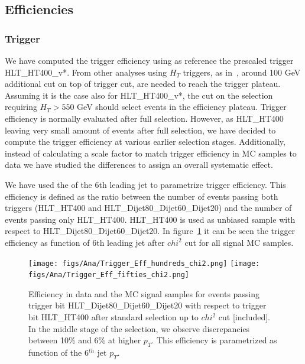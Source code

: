 \subsection{Efficiencies}
\label{sec:eff}

\subsubsection{Trigger}
\label{sec:trigger_ana}

We have computed the trigger efficiency using as reference the prescaled trigger HLT\_HT400\_v*. From other analyses using $H_{T}$ triggers, as in~\cite{Khachatryan:2015axa}, around 100 GeV additional cut on top of trigger cut, are needed to reach the trigger plateau. Assuming it is the case also for HLT\_HT400\_v*, the cut on the selection requiring $H_{T}>550$ GeV should select events in the efficiency plateau. Trigger efficiency is normally evaluated after full selection. However, as HLT\_HT400 leaving very small amount of events after full selection, we have decided to compute the trigger efficiency at various earlier selection stages. Additionally, instead of calculating a scale factor to match trigger efficiency in MC samples to data we have studied the differences to assign an overall systematic effect. 

We have used the \pt of the 6th leading jet to parametrize trigger efficiency. This efficiency is defined as the ratio between the number of events passing both triggers (HLT\_HT400 and HLT\_Dijet80\_Dijet60\_Dijet20) and the number of events passing only HLT\_HT400. HLT\_HT400 is used as unbiased sample with respect to HLT\_Dijet80\_Dijet60\_Dijet20. In figure~\ref{fig:TrigEff} it can be seen the trigger efficiency as function of 6th leading jet \pt after $chi^{2}$ cut for all signal MC samples. 

\begin{figure}[!Hhtbp]
  \begin{center}
    \texttt{[image: figs/Ana/Trigger\_Eff\_hundreds\_chi2.png]}
    \texttt{[image: figs/Ana/Trigger\_Eff\_fifties\_chi2.png]}
    \caption{Efficiency in data and the MC signal samples for events passing trigger bit HLT\_Dijet80\_Dijet60\_Dijet20 with respect to trigger bit HLT\_HT400 after standard selection up to $chi^{2}$ cut [included]. In the middle stage of the selection, we observe discrepancies between 10\% and 6\% at higher $p_{T}$. This efficiency is parametrized as function of the 6$^{th}$ jet $p_{T}$.}
    \label{fig:TrigEff}
  \end{center}
\end{figure}

